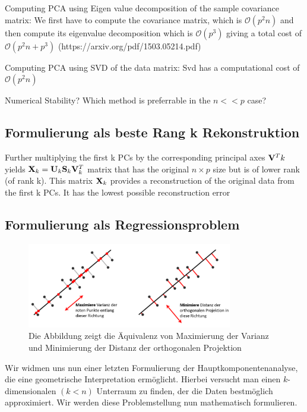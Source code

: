 Computing PCA using Eigen value decomposition of the sample covariance matrix:
We first have to compute the covariance matrix, which is $\mathcal{O}(p^2n)$ and then compute its eigenvalue decomposition which is $\mathcal{O}(p^3)$ giving a total cost of $\mathcal{O}(p^2n+p^3)$ (https://arxiv.org/pdf/1503.05214.pdf)

Computing PCA using SVD of the data matrix:
Svd has a computational cost of $\mathcal{O}(p^2n)$

Numerical Stability? Which method is preferrable in the $n << p$ case?


\subsection{Formulierung als beste Rang k Rekonstruktion}
Further multiplying the first k PCs by the corresponding principal axes $\mathbf{V}^T k$ yields $\mathbf{X}_k = \mathbf{U}_k \mathbf{S}_k \mathbf{V}_k^T$ matrix that has the original $n \times p$ size but is of lower rank (of rank k). This matrix $\mathbf{X}_k$ provides a reconstruction of the original data from the first k PCs. It has the lowest possible reconstruction error


\subsection{Formulierung als Regressionsproblem}

\begin{figure}
\centering
\includegraphics[width = 0.8\textwidth]{figures/pca_projection_explanation_german.png}
\caption{Die Abbildung zeigt die Äquivalenz von Maximierung der Varianz und Minimierung der Distanz der orthogonalen Projektion}
\label{pca_projection_explanation}
\end{figure}

Wir widmen uns nun einer letzten Formulierung der Hauptkomponentenanalyse, die eine geometrische Interpretation ermöglicht. Hierbei versucht man einen $k$-dimensionalen $(k < n)$ Unterraum zu finden, der die Daten bestmöglich approximiert. Wir werden diese Problemstellung nun mathematisch formulieren.

